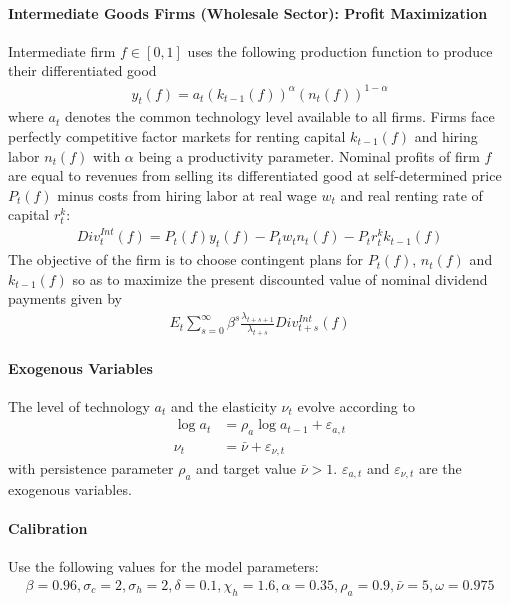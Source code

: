 \documentclass[a4paper]{scrartcl}
\begin{document}
\paragraph{Intermediate Goods Firms (Wholesale Sector): Profit Maximization}
Intermediate firm \(f\in[0,1]\) uses the following production function to produce their differentiated good
\begin{align}
y_t(f) = a_t {(k_{t-1}(f))}^\alpha {(n_t(f))}^{1-\alpha} \label{eq:RBCMonopIrrInv.IntermediateFirms.ProductionFunction}
\end{align}
where \(a_t\) denotes the common technology level available to all firms.
Firms face perfectly competitive factor markets for renting capital \(k_{t-1}(f)\) and hiring labor \(n_t(f)\) with \(\alpha \) being a productivity parameter.
Nominal profits of firm \(f\) are equal to revenues from selling its differentiated good at self-determined price \(P_t(f)\)
  minus costs from hiring labor at real wage \(w_t\) and real renting rate of capital \(r^k_t\):
\begin{align}
{Div}^{Int}_t(f) = P_t(f) y_t(f) - P_t w_t n_t(f) - P_t r^k_t k_{t-1}(f) \label{eq:RBCMonopIrrInv.Firms.Profits}
\end{align}
The objective of the firm is to choose contingent plans for \(P_t(f)\), \(n_t(f)\) and \(k_{t-1}(f)\)
  so as to maximize the present discounted value of nominal dividend payments given by
\begin{align*}
E_t \sum_{s=0}^{\infty} \beta^s \frac{\lambda_{t+s+1}}{\lambda_{t+s}} Div^{Int}_{t+s}(f)
\end{align*}

\paragraph{Exogenous Variables}
The level of technology \(a_t\) and the elasticity \(\nu_t\) evolve according to
\begin{align}
\log{a_t} &= \rho_a \log{a_{t-1}} + \varepsilon_{a,t} \label{eq:RBCMonopIrrInv.LoM.TFP}
\\
\nu_t &= \bar{\nu} + \varepsilon_{\nu,t} \label{eq:RBCMonopIrrInv.LoM.Elast}
\end{align}
with persistence parameter \(\rho_a\) and target value \(\bar{\nu}>1\).
\(\varepsilon_{a,t}\) and \(\varepsilon_{\nu,t}\) are the exogenous variables.

\paragraph{Calibration}
Use the following values for the model parameters:
\begin{align*}
\beta = 0.96,
\sigma_c = 2,
\sigma_h = 2,
\delta = 0.1,
\chi_h = 1.6, 
\alpha = 0.35,
\rho_a = 0.9,
\bar{\nu} = 5,
\omega = 0.975
\end{align*}
\end{document}
